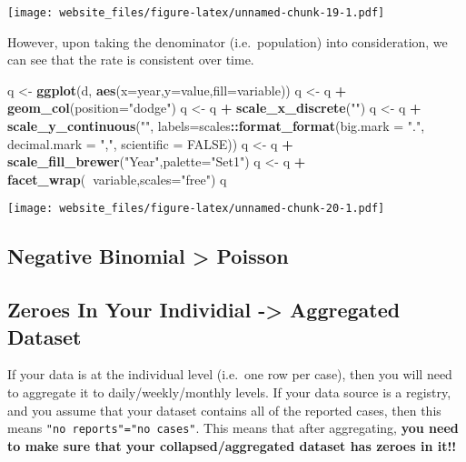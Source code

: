 \documentclass[]{book}
\newenvironment{Shaded}{\begin{snugshade}}{\end{snugshade}}
\newcommand{\KeywordTok}[1]{\textcolor[rgb]{0.13,0.29,0.53}{\textbf{#1}}}
\newcommand{\DataTypeTok}[1]{\textcolor[rgb]{0.13,0.29,0.53}{#1}}
\newcommand{\StringTok}[1]{\textcolor[rgb]{0.31,0.60,0.02}{#1}}
\newcommand{\OtherTok}[1]{\textcolor[rgb]{0.56,0.35,0.01}{#1}}
\newcommand{\OperatorTok}[1]{\textcolor[rgb]{0.81,0.36,0.00}{\textbf{#1}}}
\newcommand{\NormalTok}[1]{#1}
\begin{document}
\texttt{[image: website\_files/figure-latex/unnamed-chunk-19-1.pdf]}

However, upon taking the denominator (i.e.~population) into
consideration, we can see that the rate is consistent over time.

\begin{Shaded}
\begin{Highlighting}[]
\NormalTok{q <-}\StringTok{ }\KeywordTok{ggplot}\NormalTok{(d, }\KeywordTok{aes}\NormalTok{(}\DataTypeTok{x=}\NormalTok{year,}\DataTypeTok{y=}\NormalTok{value,}\DataTypeTok{fill=}\NormalTok{variable))}
\NormalTok{q <-}\StringTok{ }\NormalTok{q }\OperatorTok{+}\StringTok{ }\KeywordTok{geom_col}\NormalTok{(}\DataTypeTok{position=}\StringTok{"dodge"}\NormalTok{)}
\NormalTok{q <-}\StringTok{ }\NormalTok{q }\OperatorTok{+}\StringTok{ }\KeywordTok{scale_x_discrete}\NormalTok{(}\StringTok{""}\NormalTok{)}
\NormalTok{q <-}\StringTok{ }\NormalTok{q }\OperatorTok{+}\StringTok{ }\KeywordTok{scale_y_continuous}\NormalTok{(}\StringTok{""}\NormalTok{, }\DataTypeTok{labels=}\NormalTok{scales}\OperatorTok{::}\KeywordTok{format_format}\NormalTok{(}\DataTypeTok{big.mark =} \StringTok{"."}\NormalTok{, }\DataTypeTok{decimal.mark =} \StringTok{","}\NormalTok{, }\DataTypeTok{scientific =} \OtherTok{FALSE}\NormalTok{))}
\NormalTok{q <-}\StringTok{ }\NormalTok{q }\OperatorTok{+}\StringTok{ }\KeywordTok{scale_fill_brewer}\NormalTok{(}\StringTok{"Year"}\NormalTok{,}\DataTypeTok{palette=}\StringTok{"Set1"}\NormalTok{)}
\NormalTok{q <-}\StringTok{ }\NormalTok{q }\OperatorTok{+}\StringTok{ }\KeywordTok{facet_wrap}\NormalTok{(}\OperatorTok{~}\NormalTok{variable,}\DataTypeTok{scales=}\StringTok{"free"}\NormalTok{)}
\NormalTok{q}
\end{Highlighting}
\end{Shaded}

\texttt{[image: website\_files/figure-latex/unnamed-chunk-20-1.pdf]}

\subsection{Negative Binomial \textgreater{}
Poisson}\label{negative-binomial-poisson}

\subsection{Zeroes In Your Individial -\textgreater{} Aggregated
Dataset}\label{zeroes-in-your-individial---aggregated-dataset}

If your data is at the individual level (i.e.~one row per case), then
you will need to aggregate it to daily/weekly/monthly levels. If your
data source is a registry, and you assume that your dataset contains all
of the reported cases, then this means
\texttt{"no\ reports"="no\ cases"}. This means that after aggregating,
\textbf{you need to make sure that your collapsed/aggregated dataset has
zeroes in it!!}
\end{document}

